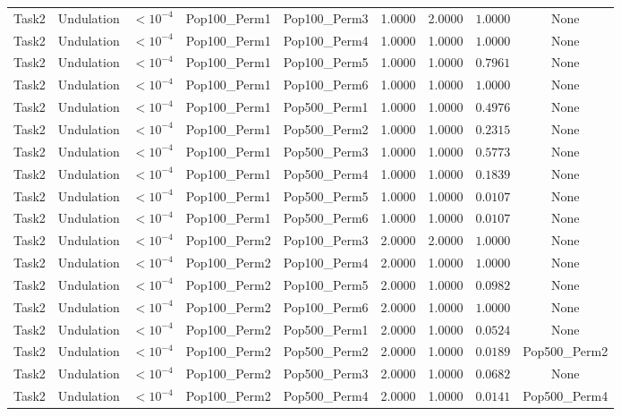 \documentclass[8pt]{article}
\begin{document}
\begin{longtable}{llccccccc}
Task2 & Undulation & $< 10^{-4}$ & Pop100\_Perm1 & Pop100\_Perm3 & 1.0000 & 2.0000 & $1.0000$ & None \\
Task2 & Undulation & $< 10^{-4}$ & Pop100\_Perm1 & Pop100\_Perm4 & 1.0000 & 1.0000 & $1.0000$ & None \\
Task2 & Undulation & $< 10^{-4}$ & Pop100\_Perm1 & Pop100\_Perm5 & 1.0000 & 1.0000 & $0.7961$ & None \\
Task2 & Undulation & $< 10^{-4}$ & Pop100\_Perm1 & Pop100\_Perm6 & 1.0000 & 1.0000 & $1.0000$ & None \\
Task2 & Undulation & $< 10^{-4}$ & Pop100\_Perm1 & Pop500\_Perm1 & 1.0000 & 1.0000 & $0.4976$ & None \\
Task2 & Undulation & $< 10^{-4}$ & Pop100\_Perm1 & Pop500\_Perm2 & 1.0000 & 1.0000 & $0.2315$ & None \\
Task2 & Undulation & $< 10^{-4}$ & Pop100\_Perm1 & Pop500\_Perm3 & 1.0000 & 1.0000 & $0.5773$ & None \\
Task2 & Undulation & $< 10^{-4}$ & Pop100\_Perm1 & Pop500\_Perm4 & 1.0000 & 1.0000 & $0.1839$ & None \\
Task2 & Undulation & $< 10^{-4}$ & Pop100\_Perm1 & Pop500\_Perm5 & 1.0000 & 1.0000 & $0.0107$ & None \\
Task2 & Undulation & $< 10^{-4}$ & Pop100\_Perm1 & Pop500\_Perm6 & 1.0000 & 1.0000 & $0.0107$ & None \\
Task2 & Undulation & $< 10^{-4}$ & Pop100\_Perm2 & Pop100\_Perm3 & 2.0000 & 2.0000 & $1.0000$ & None \\
Task2 & Undulation & $< 10^{-4}$ & Pop100\_Perm2 & Pop100\_Perm4 & 2.0000 & 1.0000 & $1.0000$ & None \\
Task2 & Undulation & $< 10^{-4}$ & Pop100\_Perm2 & Pop100\_Perm5 & 2.0000 & 1.0000 & $0.0982$ & None \\
Task2 & Undulation & $< 10^{-4}$ & Pop100\_Perm2 & Pop100\_Perm6 & 2.0000 & 1.0000 & $1.0000$ & None \\
Task2 & Undulation & $< 10^{-4}$ & Pop100\_Perm2 & Pop500\_Perm1 & 2.0000 & 1.0000 & $0.0524$ & None \\
Task2 & Undulation & $< 10^{-4}$ & Pop100\_Perm2 & Pop500\_Perm2 & 2.0000 & 1.0000 & $0.0189$ & Pop500\_Perm2 \\
Task2 & Undulation & $< 10^{-4}$ & Pop100\_Perm2 & Pop500\_Perm3 & 2.0000 & 1.0000 & $0.0682$ & None \\
Task2 & Undulation & $< 10^{-4}$ & Pop100\_Perm2 & Pop500\_Perm4 & 2.0000 & 1.0000 & $0.0141$ & Pop500\_Perm4 \\

\end{longtable}
\end{document}

